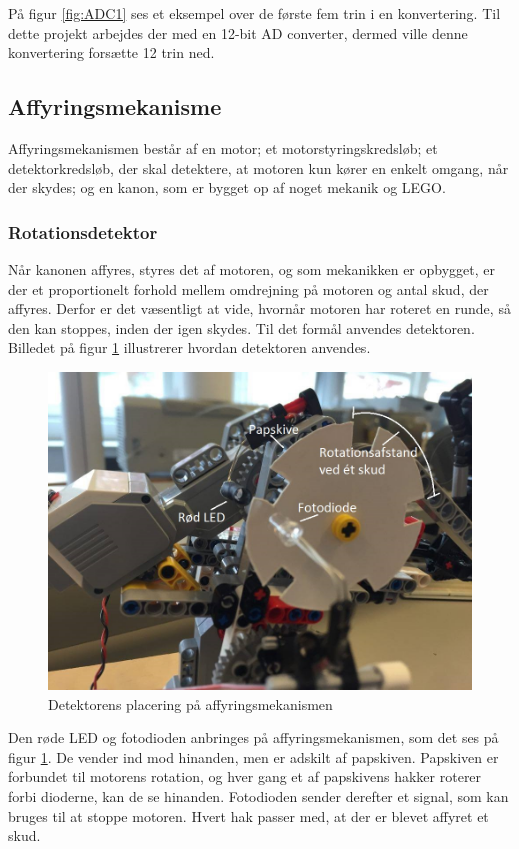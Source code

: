 \noindent På figur \ref{fig:ADC1} ses et eksempel over de første fem trin i en konvertering. Til dette projekt arbejdes der med en 12-bit AD converter, dermed ville denne konvertering forsætte 12 trin ned. 

\subsection{Affyringsmekanisme}
Affyringsmekanismen består af en motor; et motorstyringskredsløb; et detektorkredsløb, der skal detektere, at motoren kun kører en enkelt omgang, når der skydes; og en kanon, som er bygget op af noget mekanik og LEGO. 

\subsubsection{Rotationsdetektor}
Når kanonen affyres, styres det af motoren, og som mekanikken er opbygget, er der et proportionelt forhold mellem omdrejning på motoren og antal skud, der affyres. Derfor er det væsentligt at vide, hvornår motoren har roteret en runde, så den kan stoppes, inden der igen skydes. Til det formål anvendes detektoren. Billedet på figur \ref{fig:detektor} illustrerer hvordan detektoren anvendes.

\begin{figure}[H]
	\centering
	\includegraphics[width=\textwidth]{Afsnit/DesignOgImplementering/images/detektor}
	\caption{Detektorens placering på affyringsmekanismen}
	\label{fig:detektor}
\end{figure}

Den røde LED og fotodioden anbringes på affyringsmekanismen, som det ses på figur \ref{fig:detektor}. De vender ind mod hinanden, men er adskilt af papskiven. Papskiven er forbundet til motorens rotation, og hver gang et af papskivens hakker roterer forbi dioderne, kan de se hinanden. Fotodioden sender derefter et signal, som kan bruges til at stoppe motoren. Hvert hak passer med, at der er blevet affyret et skud.  

